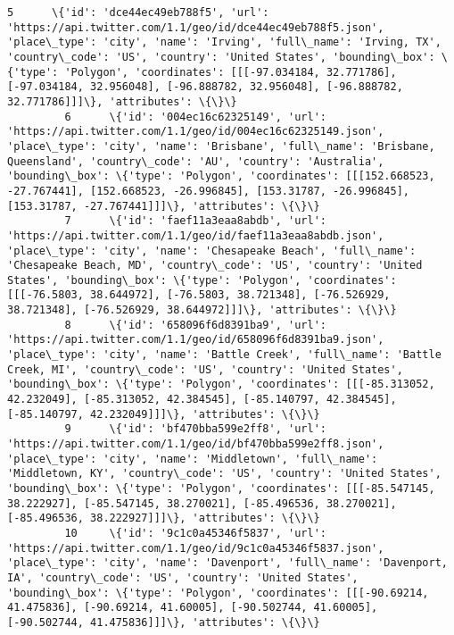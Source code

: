 \documentclass[11pt]{article}
\begin{document}
\begin{Verbatim}[commandchars=\\\{\}]
         5      \{'id': 'dce44ec49eb788f5', 'url': 'https://api.twitter.com/1.1/geo/id/dce44ec49eb788f5.json', 'place\_type': 'city', 'name': 'Irving', 'full\_name': 'Irving, TX', 'country\_code': 'US', 'country': 'United States', 'bounding\_box': \{'type': 'Polygon', 'coordinates': [[[-97.034184, 32.771786], [-97.034184, 32.956048], [-96.888782, 32.956048], [-96.888782, 32.771786]]]\}, 'attributes': \{\}\}                           
         6      \{'id': '004ec16c62325149', 'url': 'https://api.twitter.com/1.1/geo/id/004ec16c62325149.json', 'place\_type': 'city', 'name': 'Brisbane', 'full\_name': 'Brisbane, Queensland', 'country\_code': 'AU', 'country': 'Australia', 'bounding\_box': \{'type': 'Polygon', 'coordinates': [[[152.668523, -27.767441], [152.668523, -26.996845], [153.31787, -26.996845], [153.31787, -27.767441]]]\}, 'attributes': \{\}\}                 
         7      \{'id': 'faef11a3eaa8abdb', 'url': 'https://api.twitter.com/1.1/geo/id/faef11a3eaa8abdb.json', 'place\_type': 'city', 'name': 'Chesapeake Beach', 'full\_name': 'Chesapeake Beach, MD', 'country\_code': 'US', 'country': 'United States', 'bounding\_box': \{'type': 'Polygon', 'coordinates': [[[-76.5803, 38.644972], [-76.5803, 38.721348], [-76.526929, 38.721348], [-76.526929, 38.644972]]]\}, 'attributes': \{\}\}           
         8      \{'id': '658096f6d8391ba9', 'url': 'https://api.twitter.com/1.1/geo/id/658096f6d8391ba9.json', 'place\_type': 'city', 'name': 'Battle Creek', 'full\_name': 'Battle Creek, MI', 'country\_code': 'US', 'country': 'United States', 'bounding\_box': \{'type': 'Polygon', 'coordinates': [[[-85.313052, 42.232049], [-85.313052, 42.384545], [-85.140797, 42.384545], [-85.140797, 42.232049]]]\}, 'attributes': \{\}\}               
         9      \{'id': 'bf470bba599e2ff8', 'url': 'https://api.twitter.com/1.1/geo/id/bf470bba599e2ff8.json', 'place\_type': 'city', 'name': 'Middletown', 'full\_name': 'Middletown, KY', 'country\_code': 'US', 'country': 'United States', 'bounding\_box': \{'type': 'Polygon', 'coordinates': [[[-85.547145, 38.222927], [-85.547145, 38.270021], [-85.496536, 38.270021], [-85.496536, 38.222927]]]\}, 'attributes': \{\}\}                   
         10     \{'id': '9c1c0a45346f5837', 'url': 'https://api.twitter.com/1.1/geo/id/9c1c0a45346f5837.json', 'place\_type': 'city', 'name': 'Davenport', 'full\_name': 'Davenport, IA', 'country\_code': 'US', 'country': 'United States', 'bounding\_box': \{'type': 'Polygon', 'coordinates': [[[-90.69214, 41.475836], [-90.69214, 41.60005], [-90.502744, 41.60005], [-90.502744, 41.475836]]]\}, 'attributes': \{\}\}                         

\end{Verbatim}
\end{document}
